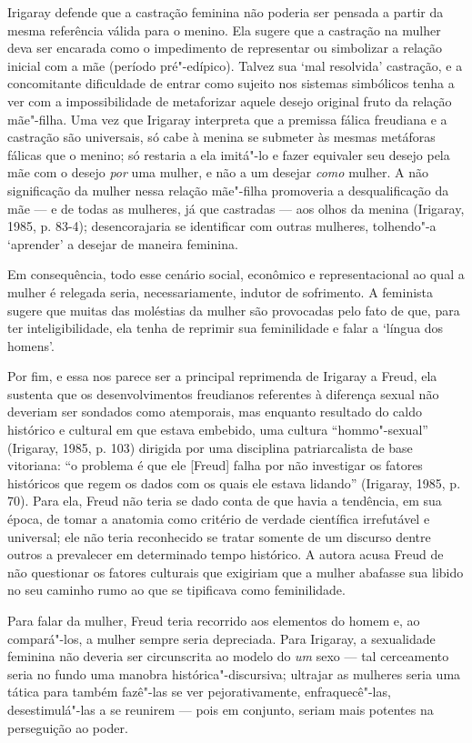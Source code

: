 Irigaray defende que a castração feminina não poderia ser pensada a
partir da mesma referência válida para o menino. Ela sugere que a
castração na mulher deva ser encarada como o impedimento de representar
ou simbolizar a relação inicial com a mãe (período pré"-edípico). Talvez
sua `mal resolvida' castração, e a concomitante dificuldade de entrar
como sujeito nos sistemas simbólicos tenha a ver com a impossibilidade
de metaforizar aquele desejo original fruto da relação mãe"-filha. Uma
vez que Irigaray interpreta que a premissa fálica freudiana e a
castração são universais, só cabe à menina se submeter às mesmas
metáforas fálicas que o menino; só restaria a ela imitá"-lo e fazer
equivaler seu desejo pela mãe com o desejo \emph{por} uma mulher, e não
a um desejar \emph{como} mulher. A não significação da mulher nessa
relação mãe"-filha promoveria a desqualificação da mãe --- e de todas as
mulheres, já que castradas --- aos olhos da menina (Irigaray, 1985,
p. 83-4); desencorajaria se identificar com outras mulheres, tolhendo"-a
`aprender' a desejar de maneira feminina.

Em consequência, todo esse cenário social, econômico e representacional
ao qual a mulher é relegada seria, necessariamente, indutor de
sofrimento. A feminista sugere que muitas das moléstias da mulher são
provocadas pelo fato de que, para ter inteligibilidade, ela tenha de
reprimir sua feminilidade e falar a `língua dos homens'.

Por fim, e essa nos parece ser a principal reprimenda de Irigaray a
Freud, ela sustenta que os desenvolvimentos freudianos referentes à
diferença sexual não deveriam ser sondados como atemporais, mas enquanto
resultado do caldo histórico e cultural em que estava embebido, uma
cultura ``hommo"-sexual'' (Irigaray, 1985, p. 103) dirigida por uma
disciplina patriarcalista de base vitoriana: ``o problema é que ele
{[}Freud{]} falha por não investigar os fatores históricos que regem os
dados com os quais ele estava lidando'' (Irigaray, 1985, p. 70).
Para ela, Freud não teria se dado conta de que havia a tendência, em sua
época, de tomar a anatomia como critério de verdade científica
irrefutável e universal; ele não teria reconhecido se tratar somente de
um discurso dentre outros a prevalecer em determinado tempo histórico. A
autora acusa Freud de não questionar os fatores culturais que exigiriam
que a mulher abafasse sua libido no seu caminho rumo ao que se
tipificava como feminilidade.

Para falar da mulher, Freud teria recorrido aos elementos do homem e, ao
compará"-los, a mulher sempre seria depreciada. Para Irigaray, a
sexualidade feminina não deveria ser circunscrita ao modelo do \emph{um}
sexo --- tal cerceamento seria no fundo uma manobra histórica"-discursiva;
ultrajar as mulheres seria uma tática para também fazê"-las se ver
pejorativamente, enfraquecê"-las, desestimulá"-las a se reunirem --- pois
em conjunto, seriam mais potentes na perseguição ao poder.

